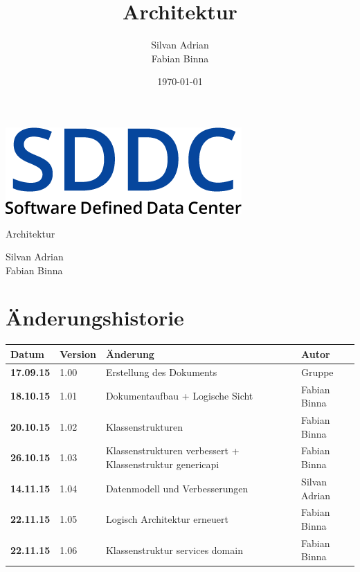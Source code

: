 \documentclass[11pt]{scrartcl}
\title{Architektur}
\author{Silvan Adrian \\ Fabian Binna}
\date{\today{}}
\begin{document}
\def\arraystretch{1.5}
\begin{titlepage}
\begin{center}
\vspace{10em}
\includegraphics[scale=2]{SDDC}
\vspace{10em}
\end{center}
\begin{center}
\huge {Architektur}
\end{center}
\begin{center}
\vspace{10em}
\LARGE {Silvan Adrian} \\
\LARGE {Fabian Binna}
\end{center}

\end{titlepage}

\newpage
\section{Änderungshistorie}
\begin{tabularx}{\linewidth}{l l X l}
\textbf{Datum} & \textbf{Version} & \textbf{Änderung}  & \textbf{Autor} \\
\hline
\textbf{17.09.15} & 1.00 & Erstellung des Dokuments & Gruppe \\
\textbf{18.10.15} & 1.01 & Dokumentaufbau + Logische Sicht & Fabian Binna\\
\textbf{20.10.15} & 1.02 & Klassenstrukturen & Fabian Binna\\
\textbf{26.10.15} & 1.03 & Klassenstrukturen verbessert + Klassenstruktur genericapi & Fabian Binna\\
\textbf{14.11.15} & 1.04 & Datenmodell und Verbesserungen & Silvan Adrian\\
\textbf{22.11.15} & 1.05 & Logisch Architektur erneuert & Fabian Binna\\
\textbf{22.11.15} & 1.06 & Klassenstruktur services domain & Fabian Binna\\

\end{tabularx}

\newpage
\tableofcontents
\newpage
\end{document}
